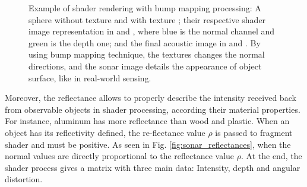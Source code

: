 \documentclass[final,5p,times]{elsarticle}
\begin{document}
\begin{figure}[t]
{        \label{fig:bump_5}
    }
    \captionsetup{justification=centering}
    \caption{Example of shader rendering with bump mapping processing: A sphere without texture  and with texture ; their respective shader image representation in  and , where blue is the normal channel and green is the depth one; and the final acoustic image in  and . By using bump mapping technique, the textures changes the normal directions, and the sonar image details the appearance of object surface, like in real-world sensing.}
    \label{fig:sonar_bump_mapping}
\end{figure}

Moreover, the reflectance allows to properly describe the intensity received back from observable objects in shader processing, according their material properties. For instance, aluminum has more reflectance than wood and plastic. When an object has its reflectivity defined, the re\hyp{}flectance value $\rho$ is passed to fragment shader and must be positive. As seen in Fig. \ref{fig:sonar_reflectances}, when the normal values are directly proportional to the reflectance value $\rho$. At the end, the shader process gives a matrix with three main data: Intensity, depth and angular distortion.
\end{document}
